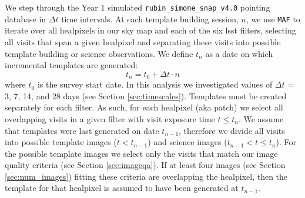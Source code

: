 \documentclass[preprintm,linenumbers]{aastex631}
\newcommand{\baseline}{\texttt{one\_snap\_v4.0}\xspace}
\newcommand{\rubinsim}{\texttt{rubin\_sim}\xspace}
\newcommand{\maf}{\texttt{MAF}\xspace}
\begin{document}
		We step through the Year 1 simulated \rubinsim \baseline pointing database in $\Delta t$ time intervals. 
  At each template building session, $n$, we use \maf to iterate over all healpixels in our sky map and each of the six \gls*{lsst} filters, selecting all visits that span a given healpixel and separating these visits into possible template building or science observations. 
  We define $t_n$ as a date on which incremental templates are generated:
		\begin{equation}
			t_n= t_0+ \Delta t\cdot n
		\end{equation}
		where $t_0$ is the survey start date. 
  In this analysis we investigated values of $\Delta t$ = 3, 7, 14, and  28 days (see Section \ref{sec:timescales}).
  Templates must be created separately for each filter. 
  As such, for each healpixel (aka patch) we select all overlapping visits in a given filter with visit exposure time $t \leq t_n$. 
  We assume that templates were last generated on date $t_{n-1}$, therefore we divide all visits into possible template images ($t < t_{n-1}$) and science images ($t_{n-1}< t \leq t_n$).
For the possible template images we select only the visits that match our image quality criteria (see Section \ref{sec:imageqa}). 
  If at least four images (see Section \ref{sec:num_images}) fitting these criteria are overlapping the healpixel, then the template for that healpixel is assumed to have been generated at $t_{n-1}$.
  
\end{document}
